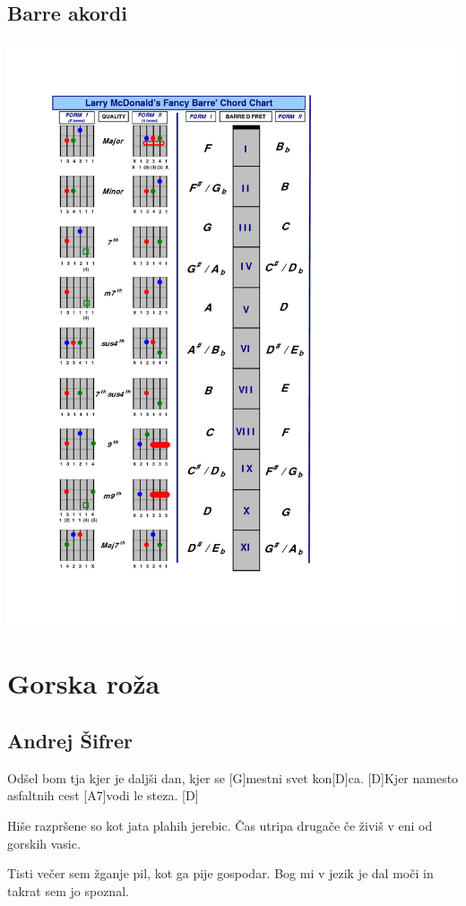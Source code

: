 \documentclass[a4paper,12pt]{article}
\begin{document}
\begin{multicols}{2}
\subsection*{Barre akordi}
\includegraphics[width=140mm]{img/barre.png}
\clearpage
\section{Gorska roža}
\subsection*{Andrej Šifrer}
\begin{guitar}
[D]Odšel bom tja kjer je daljši dan,
kjer se [G]mestni svet kon[D]ca.
[D]Kjer namesto asfaltnih cest
[A7]vodi le steza. [D]


Hiše razpršene so
kot jata plahih jerebic.
Čas utripa drugače če živiš
v eni od gorskih vasic.


Tisti večer sem žganje pil,
kot ga pije gospodar.
Bog mi v jezik je dal moči
in takrat sem jo spoznal.



\end{guitar}
\end{multicols}
\end{document}
